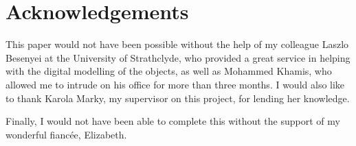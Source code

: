 \documentclass{l4proj}
\begin{document}
\chapter{Acknowledgements}
This paper would not have been possible without the help of my colleague Laszlo Besenyei at the University of Strathclyde, who provided a great service in helping with the digital modelling of the objects, as well as Mohammed Khamis, who allowed me to intrude on his office for more than three months. I would also like to thank Karola Marky, my supervisor on this project, for lending her knowledge. 

Finally, I would not have been able to complete this without the support of my wonderful fianc\'ee, Elizabeth.

%
% 
\end{document}
